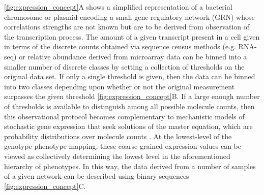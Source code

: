 \ref{fig:expression_concept}A shows a simplified representation of a bacterial chromosome or plasmid encoding a small gene regulatory network (GRN) whose correlations strengths are not known but are to be derived from observation of the transcription process. The amount of a given transcript present in a cell given in terms of the discrete counts obtained via sequence census methods (e.g. RNA-seq) or relative abundance derived from microarray data can be binned into a smaller number of discrete classes by setting a collection of thresholds on the original data set. If only a single threshold is given, then the data can be binned into two classes depending upon whether or not the original measurement surpasses the given threshold \ref{fig:expression_concept}B. If a large enough number of thresholds is available to distinguish among all possible molecule counts, then this observational protocol becomes complementary to mechanistic models of stochastic gene expression that seek solutions of the master equation, which are probability distributions over molecule counts \cite{Walczak2009,Mugler2009}. At the lowest-level of the genotype-phenotype mapping, these coarse-grained expression values can be viewed as collectively determining the lowest level in the aforementioned hierarchy of phenotypes. In this way, the data derived from a number of samples of a given network can be described using binary sequences \ref{fig:expression_concept}C.

